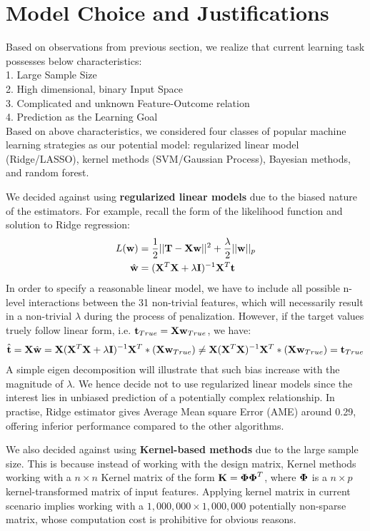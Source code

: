 \documentclass[11pt]{article}
\theoremstyle{definition}
\begin{document}
\newpage
\section{\textbf{Model Choice and Justifications}}
Based on observations from previous section, we realize that current learning task possesses below characteristics:\\

1. Large Sample Size\\
2. High dimensional, binary Input Space\\
3. Complicated and unknown Feature-Outcome relation\\
4. Prediction as the Learning Goal\\

Based on above characteristics, we considered four classes of popular machine learning strategies as our potential model: regularized linear model (Ridge/LASSO), kernel methods (SVM/Gaussian Process), Bayesian methods, and random forest.

We decided against using \textbf{regularized linear models} due to the biased nature of the estimators. For example, recall the form of the likelihood function and solution to Ridge regression:
\begin{align*}
L({\bf w}) &= \frac{1}{2} || {\bf T} - {\bf X}{\bf w}||^2 + \frac{\lambda}{2}||{\bf w}||_p\\
\hat{{\bf w}} &= ({\bf X}^T{\bf X} + \lambda {\bf I})^{-1}{\bf X}^T{\bf t}
\end{align*}
In order to specify a reasonable linear model, we have to include all possible n-level interactions between the 31 non-trivial features, which will necessarily result in a non-trivial $\lambda$ during the process of penalization. However, if the target values truely follow linear form, i.e. ${\bf t}_{True} = {\bf X} {\bf w}_{True}$, we have:
\begin{align*}
\hat{{\bf t}} = {\bf X}\hat{{\bf w}} =  {\bf X}({\bf X}^T{\bf X} + \lambda {\bf I})^{-1}{\bf X}^T * ({\bf X} {\bf w}_{True}) \neq  {\bf X}({\bf X}^T{\bf X})^{-1}{\bf X}^T * ({\bf X} {\bf w}_{True}) = {\bf t}_{True} 
\end{align*}
A simple eigen decomposition will illustrate that such bias increase with the magnitude of $\lambda$. We hence decide not to use regularized linear models since the interest lies in unbiased prediction of a potentially complex relationship. In practise, Ridge estimator gives Average Mean square Error (AME) around 0.29, offering inferior performance compared to the other algorithms.

We also decided against using \textbf{Kernel-based methods} due to the large sample size. This is because instead of working with the design matrix, Kernel methods working with a $n \times n$ Kernel matrix of the form ${\bf K} = \boldsymbol{\Phi} \boldsymbol{\Phi}^T$, where $\boldsymbol{\Phi}$ is a $n \times p$ kernel-transformed matrix of input features. Applying kernel matrix in current scenario implies working with a $1,000,000 \times 1,000,000$ potentially non-sparse matrix, whose computation cost is prohibitive for obvious reasons. 
\end{document}
